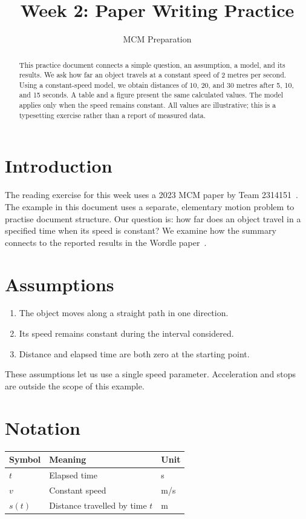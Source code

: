 \documentclass[11pt,letterpaper]{article}
\title{Week 2: Paper Writing Practice}
\author{MCM Preparation}
\date{}
\begin{document}
\maketitle

\begin{abstract}
This practice document connects a simple question, an assumption, a model,
and its results. We ask how far an object travels at a constant speed of
2 metres per second. Using a constant-speed model, we obtain distances of
10, 20, and 30 metres after 5, 10, and 15 seconds. A table and a figure
present the same calculated values. The model applies only when the speed
remains constant. All values are illustrative; this is a typesetting
exercise rather than a report of measured data.
\end{abstract}

\section{Introduction}
The reading exercise for this week uses a 2023 MCM paper by
Team 2314151~\citep{wordle2023}. The example in this document uses a
separate, elementary motion problem to practise document structure.
Our question is: how far does an object travel in a specified time
when its speed is constant?
We examine how the summary connects to the reported
results in the Wordle paper~\citep{wordle2023}.

\section{Assumptions}
\begin{enumerate}
  \item The object moves along a straight path in one direction.
  \item Its speed remains constant during the interval considered.
  \item Distance and elapsed time are both zero at the starting point.
\end{enumerate}
These assumptions let us use a single speed parameter. Acceleration and
stops are outside the scope of this example.

\section{Notation}
\begin{center}
\begin{tabular}{lll}
\toprule
Symbol & Meaning & Unit \\
\midrule
$t$ & Elapsed time & s \\
$v$ & Constant speed & m/s \\
$s(t)$ & Distance travelled by time $t$ & m \\
\bottomrule
\end{tabular}
\end{center}
\end{document}

